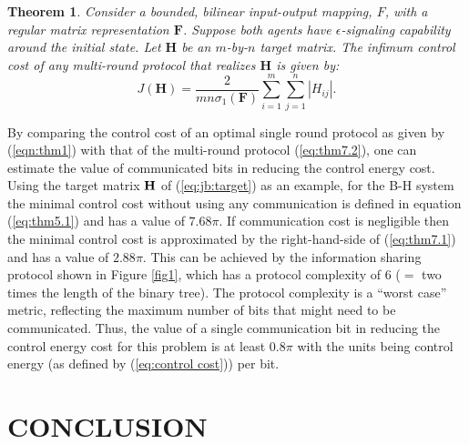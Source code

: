 \documentclass[12pt,onecolumn,draftcls]{IEEEtran}
\newcommand{\bH}{\mathbf{H}}
\newtheorem{theorem}{Theorem}[section]
\begin{document}
\begin{theorem}
\label{thm:3}
Consider a bounded, bilinear input-output mapping, $F$, with a regular matrix representation $\mathbf{F}$.
Suppose both agents have $\epsilon$-signaling capability around the initial state.
Let $\mathbf{H}$ be an $m$-by-$n$ target matrix.
The infimum control cost of any multi-round protocol that realizes $\mathbf{H}$ is given by:
\begin{equation}
J(\bH)=\frac{2}{mn\sigma_{1}(\mathbf{F})} \sum_{i=1}^{m} \sum_{j=1}^{n} |H_{ij}|.
\label{eq:thm7.2}
\end{equation}
\end{theorem}

By comparing the control cost of an optimal single round protocol as given by (\ref{eqn:thm1}) with that of the multi-round protocol (\ref{eq:thm7.2}), one
can estimate the value of  communicated bits in reducing the control energy cost.  
Using the target matrix $\bf{H}$ of (\ref{eq:jb:target}) as an example, for the B-H system the minimal control cost without using any communication is defined in equation (\ref{eq:thm5.1}) and has a value of  $7.68 \pi$.  If
communication cost is negligible then the minimal control cost is approximated by the right-hand-side of (\ref{eq:thm7.1}) and has a value of $2.88 \pi$.  This can be achieved by the information sharing protocol shown in Figure \ref{fig1}, which has a protocol complexity of 6 ($=$ two times the length of the binary tree).  The protocol complexity is a ``worst case'' metric, reflecting the maximum number of bits that might need to be communicated.  Thus, the value of a single communication bit in reducing the control energy cost for this problem is at least $0.8 \pi$ with the units being control energy (as defined by (\ref{eq:control cost})) per bit.

\section{CONCLUSION}\setcounter{equation}{0}
\end{document}
